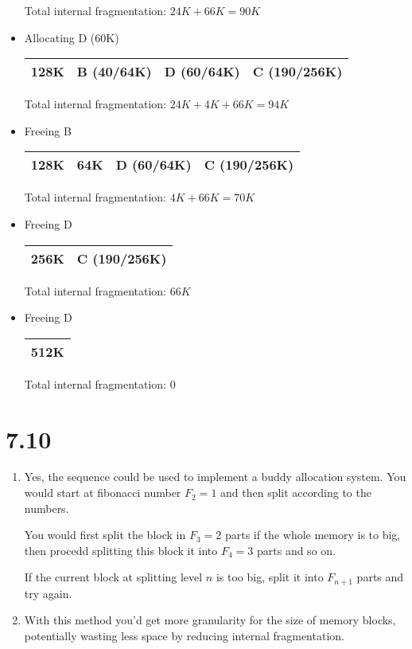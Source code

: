 \documentclass[12pt]{article}
\begin{document}
\begin{itemize}
		Total internal fragmentation: $24K + 66K = 90K$

		\item Allocating D (60K)

		\begin{tabular}{|p{}|p{}|p{}|p{}|}
			\hline
			128K & B (40/64K) & D (60/64K) & C (190/256K)\\
			\hline
		\end{tabular}

		Total internal fragmentation: $24K + 4K + 66K = 94K$

		\item Freeing B

		\begin{tabular}{|p{}|p{}|p{}|p{}|}
			\hline
			128K & 64K & D (60/64K) & C (190/256K)\\
			\hline
		\end{tabular}

		Total internal fragmentation: $4K + 66K = 70K$

		\item Freeing D

		\begin{tabular}{|p{}|p{}|}
			\hline
			256K & C (190/256K)\\
			\hline
		\end{tabular}

		Total internal fragmentation: $66K$

		\item Freeing D

		\begin{tabular}{|p{\linewidth}|}
			\hline
			512K\\
			\hline
		\end{tabular}

		Total internal fragmentation: $0$

	\end{itemize}

\section*{7.10}
\begin{enumerate}[a]
	\item %
	Yes, the sequence could be used to implement a buddy allocation system. You would start at fibonacci number $F_2 = 1$ and then split according to the numbers.

	You would first split the block in $F_3 = 2$ parts if the whole memory is to big, then procedd splitting this block it into $F_4 = 3$ parts and so on.

	If the current block at splitting level $n$ is too big, split it into $F_{n + 1}$ parts and try again.

	\item %
	With this method you'd get more granularity for the size of memory blocks, potentially wasting less space by reducing internal fragmentation.
\end{enumerate}
\end{document}
